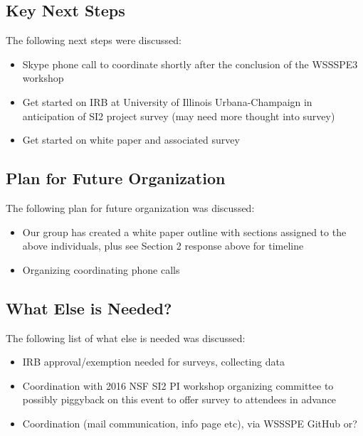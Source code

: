 \subsection{Key Next Steps}

The following next steps were discussed:

\begin{itemize}
\item
Skype phone call to coordinate shortly after the conclusion of the WSSSPE3 workshop

\item
Get started on IRB at University of Illinois Urbana-Champaign in anticipation of SI2 project survey (may need more thought into survey)

\item
Get started on white paper and associated survey

\end{itemize}



\subsection{Plan for Future Organization}

The following plan for future organization was discussed:

\begin{itemize}
\item
Our group has created a white paper outline with sections assigned to the above individuals, plus see Section 2 response above for timeline

\item
Organizing coordinating phone calls

\end{itemize}




\subsection{What Else is Needed?}

The following list of what else is needed was discussed:

\begin{itemize}
\item
IRB approval/exemption needed for surveys, collecting data

\item
Coordination with 2016 NSF SI2 PI workshop organizing committee to possibly piggyback on this event to offer survey to attendees in advance

\item
Coordination (mail communication, info page etc), via WSSSPE GitHub or?

\end{itemize}



